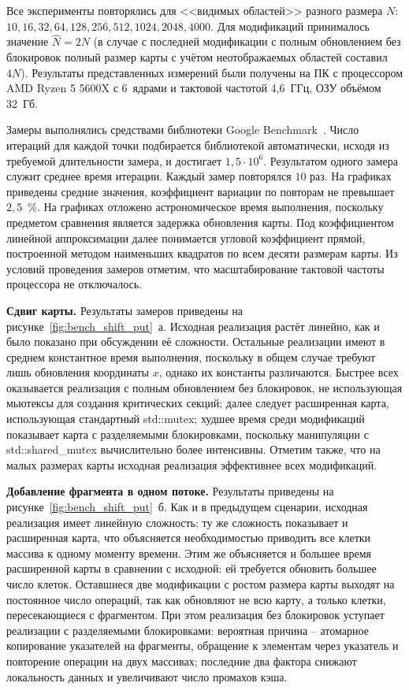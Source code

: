 Все эксперименты повторялись для <<видимых областей>> разного размера $N$: $10, 16, 32, 64, 128, 256, 512, 1024, 2048, 4000$. Для модификаций принималось значение $\widehat{N} = 2N$ (в случае с последней модификации с полным обновлением без блокировок полный размер карты с учётом неотображаемых областей составил $4N$). Результаты представленных измерений были получены на ПК с процессором AMD Ryzen 5 5600X с 6~ядрами и тактовой частотой 4,6~ГГц, ОЗУ объёмом 32~Гб.

Замеры выполнялись средствами библиотеки Google Benchmark~\cite{googlebenchmark}. Число итераций для каждой точки подбирается библиотекой автоматически, исходя из требуемой длительности замера, и достигает $1,5\cdot10^{6}$. Результатом одного замера служит среднее время итерации. Каждый замер повторялся $10$ раз. На графиках приведены средние значения, коэффициент вариации по повторам не превышает $2,5$~\%. На графиках отложено астрономическое время выполнения, поскольку предметом сравнения является задержка обновления карты. Под коэффициентом линейной аппроксимации далее понимается угловой коэффициент прямой, построенной методом наименьших квадратов по всем десяти размерам карты. Из условий проведения замеров отметим, что масштабирование тактовой частоты процессора не отключалось.

\textbf{Сдвиг карты.} Результаты замеров приведены на рисунке~\ref{fig:bench_shift_put}~а. Исходная реализация растёт линейно, как и было показано при обсуждении её сложности. Остальные реализации имеют в среднем константное время выполнения, поскольку в общем случае требуют лишь обновления координаты $x$, однако их константы различаются. Быстрее всех оказывается реализация с полным обновлением без блокировок, не использующая мьютексы для создания критических секций; далее следует расширенная карта, использующая стандартный std::mutex; худшее время среди модификаций показывает карта с разделяемыми блокировками, поскольку манипуляции с std::shared\_mutex вычислительно более интенсивны. Отметим также, что на малых размерах карты исходная реализация эффективнее всех модификаций.

\textbf{Добавление фрагмента в одном потоке.} Результаты приведены на рисунке~\ref{fig:bench_shift_put}~б. Как и в предыдущем сценарии, исходная реализация имеет линейную сложность; ту же сложность показывает и расширенная карта, что объясняется необходимостью приводить все клетки массива к одному моменту времени. Этим же объясняется и большее время расширенной карты в сравнении с исходной: ей требуется обновить большее число клеток. Оставшиеся две модификации с ростом размера карты выходят на постоянное число операций, так как обновляют не всю карту, а только клетки, пересекающиеся с фрагментом. При этом реализация без блокировок уступает реализации с разделяемыми блокировками: вероятная причина -- атомарное копирование указателей на фрагменты, обращение к элементам через указатель и повторение операции на двух массивах; последние два фактора снижают локальность данных и увеличивают число промахов кэша.

